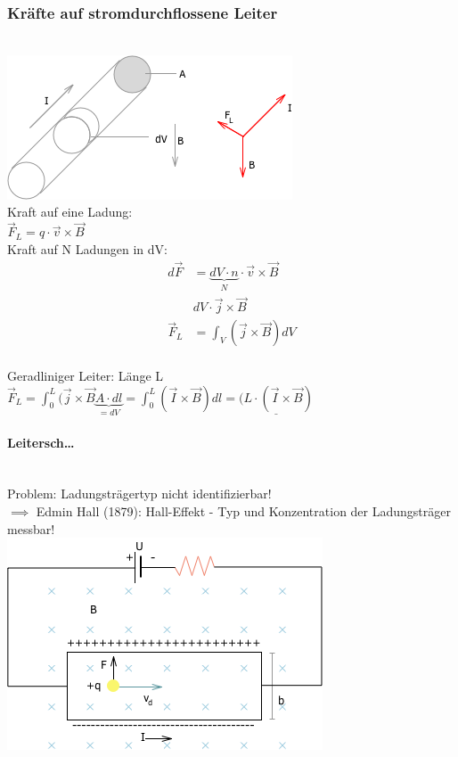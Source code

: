   \subsubsection{Kräfte auf stromdurchflossene Leiter}\leavevmode \\
  
        \includegraphics{skizzen/16/16_1B07}\\
        
        Kraft auf eine Ladung:\\
        $\vec{F}_L=q\cdot \vec{v}\times\vec{B}$\\
        
        Kraft auf N Ladungen in dV:\\
        \begin{align}
        	d\vec{F}&= \underbrace{dV\cdot n}_{N}\cdot \vec{v}\times\vec{B}\\
        	&dV\cdot\vec{j}\times\vec{B}\\
        	\vec{F}_L&=\int_V(\vec{j}\times\vec{B})dV
        \end{align}\\
        
        Geradliniger Leiter: Länge L\\
        
        $\vec{F}_L=\int_0^L(\vec{j}\times\vec{B}\underbrace{A\cdot dl}_{=dV}=\int_0^L(\vec{I}\times\vec{B})dl=\underline{(L\cdot(\vec{I}\times\vec{B})}$\\
        
        \paragraph{Leitersch…}\leavevmode \\
        Problem: Ladungsträgertyp nicht identifizierbar!\\
        $\implies$ Edmin Hall (1879): Hall-Effekt - Typ und Konzentration der Ladungsträger messbar!\\
        
        \includegraphics{skizzen/16/16_1B08}\\
        
